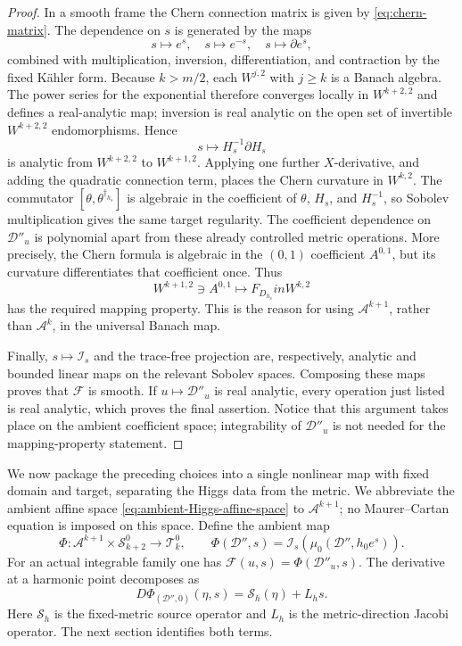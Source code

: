 \documentclass[11pt,reqno]{amsart}
\theoremstyle{definition}
\theoremstyle{remark}
\newcommand{\cA}{\mathcal A}
\newcommand{\cD}{\mathcal D}
\newcommand{\cF}{\mathcal F}
\newcommand{\cS}{\mathcal S}
\newcommand{\cT}{\mathcal T}
\begin{document}
\begin{proof}
In a smooth frame the Chern connection matrix is given by
\eqref{eq:chern-matrix}.  The dependence on $s$ is generated by the maps
\[
  s\mapsto e^s,
  \quad
  s\mapsto e^{-s},
  \quad
  s\mapsto \partial e^s,
\]
combined with multiplication, inversion, differentiation, and
contraction by the fixed K\"ahler form.  Because $k>m/2$, each
$W^{j,2}$ with $j\ge k$ is a Banach algebra.  The power series for the
exponential therefore converges locally in $W^{k+2,2}$ and defines a
real-analytic map; inversion is real analytic on the open set of
invertible $W^{k+2,2}$ endomorphisms.  Hence
\[
 s\longmapsto H_s^{-1}\partial H_s
\]
is analytic from $W^{k+2,2}$ to $W^{k+1,2}$.  Applying one further
$X$-derivative, and adding the quadratic connection term, places the
Chern curvature in $W^{k,2}$.  The commutator
$[\theta,\theta^{\dagger_{h_s}}]$ is algebraic in the coefficient of
$\theta$, $H_s$, and $H_s^{-1}$, so Sobolev multiplication gives the
same target regularity.  The coefficient dependence on $\cD''_u$ is
polynomial apart from these already controlled metric operations.  More
precisely, the Chern formula is algebraic in the $(0,1)$ coefficient
$A^{0,1}$, but its curvature differentiates that coefficient once.
Thus
\[
 W^{k+1,2}\ni A^{0,1}\longmapsto F_{D_{h_s}}in W^{k,2}
\]
has the required mapping property.  This is the reason for using
$\cA^{k+1}$, rather than $\cA^k$, in the universal Banach map.

Finally, $s\mapsto\mathcal I_s$ and the trace-free projection are,
respectively, analytic and bounded linear maps on the relevant
Sobolev spaces.  Composing these maps proves that $\cF$ is smooth.  If
$u\mapsto\cD''_u$ is real analytic, every operation just listed is
real analytic, which proves the final assertion.  Notice that this
argument takes place on the ambient coefficient space; integrability
of $\cD''_u$ is not needed for the mapping-property statement.
\end{proof}


We now package the preceding choices into a single nonlinear map with
fixed domain and target, separating the Higgs data from the metric.  We
abbreviate the ambient affine space
\eqref{eq:ambient-Higgs-affine-space} to $\cA^{k+1}$; no
Maurer--Cartan equation is imposed on this space.  Define the ambient map
\begin{equation}\label{eq:universal-moment-map}
  \Phi:\cA^{k+1}\times\cS_{k+2}^0\to\cT_k^0,
  \qquad
  \Phi(\cD'',s)=\mathcal I_s\!\left(\mu_0(\cD'',h_0e^s)\right).
\end{equation}
For an actual integrable family one has $\cF(u,s)=\Phi(\cD''_u,s)$.  The derivative at a harmonic point decomposes as
\begin{equation}\label{eq:derivative-splitting}
  D\Phi_{(\cD'',0)}(\eta,s)
  =\cS_h(\eta)+L_hs.
\end{equation}
Here $\cS_h$ is the fixed-metric source operator and $L_h$ is the metric-direction Jacobi operator.  The next section identifies both terms.
\end{document}

